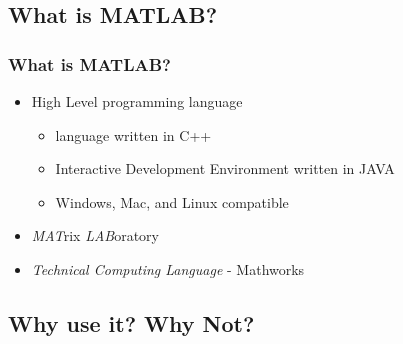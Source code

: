 \documentclass{ltx-talk} %
\newcommand{\sectionIIsubsectionItitle}{What is MATLAB?}
\newcommand{\sectionIIsubsectionIItitle}{Why use it? Why Not?}
\begin{document}
		\subsection{\sectionIIsubsectionItitle}\label{sectionIIsubsectionI}

			\begin{frame}[label=sectionIIsubsectionI]
				\frametitle{\sectionIIsubsectionItitle}

				\begin{itemize}
					\item High Level programming language
					\begin{itemize}
						\item language written in C++
						\item Interactive Development Environment written in JAVA 
						\item Windows, Mac, and Linux compatible
					\end{itemize}
					\item {\it MAT}rix {\it LAB}oratory
					\item {\it Technical Computing Language} - Mathworks
				\end{itemize}	

				\btVFill
			\end{frame}

		\subsection{\sectionIIsubsectionIItitle}\label{sectionIIsubsectionII}
\end{document}
